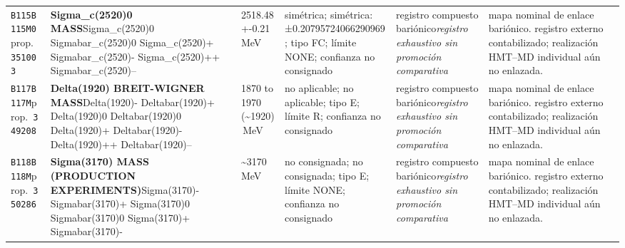 \begin{landscape}
\begin{longtable}{L{1.85cm}L{4.45cm}L{2.35cm}L{4.05cm}L{3.35cm}L{7.15cm}}
\texttt{B115}\newline \texttt{B115M0}\newline prop.\ \texttt{351003} & \textbf{Sigma\_\allowbreak{}c(2520)0 MASS}\newline Sigma\_\allowbreak{}c(2520)0 \textbar{}\allowbreak{} Sigmabar\_\allowbreak{}c(2520)0 \textbar{}\allowbreak{} Sigma\_\allowbreak{}c(2520)+ \textbar{}\allowbreak{} Sigmabar\_\allowbreak{}c(2520)- \textbar{}\allowbreak{} Sigma\_\allowbreak{}c(2520)++ \textbar{}\allowbreak{} Sigmabar\_\allowbreak{}c(2520)-- & 2518.48+-0.21\,MeV & simétrica; simétrica: ±0.20795724066290969; tipo FC; límite NONE; confianza no consignado & registro compuesto bariónico\newline \emph{registro exhaustivo sin promoción comparativa} & mapa nominal de enlace bariónico. registro externo contabilizado; realización HMT--MD individual aún no enlazada. \\
\texttt{B117}\newline \texttt{B117M}\newline prop.\ \texttt{349208} & \textbf{Delta(1920) BREIT-WIGNER MASS}\newline Delta(1920)- \textbar{}\allowbreak{} Deltabar(1920)+ \textbar{}\allowbreak{} Delta(1920)0 \textbar{}\allowbreak{} Deltabar(1920)0 \textbar{}\allowbreak{} Delta(1920)+ \textbar{}\allowbreak{} Deltabar(1920)- \textbar{}\allowbreak{} Delta(1920)++ \textbar{}\allowbreak{} Deltabar(1920)-- & 1870 to 1970 (\textasciitilde{}1920)\,MeV & no aplicable; no aplicable; tipo E; límite R; confianza no consignado & registro compuesto bariónico\newline \emph{registro exhaustivo sin promoción comparativa} & mapa nominal de enlace bariónico. registro externo contabilizado; realización HMT--MD individual aún no enlazada. \\
\texttt{B118}\newline \texttt{B118M}\newline prop.\ \texttt{350286} & \textbf{Sigma(3170) MASS (PRODUCTION EXPERIMENTS)}\newline Sigma(3170)- \textbar{}\allowbreak{} Sigmabar(3170)+ \textbar{}\allowbreak{} Sigma(3170)0 \textbar{}\allowbreak{} Sigmabar(3170)0 \textbar{}\allowbreak{} Sigma(3170)+ \textbar{}\allowbreak{} Sigmabar(3170)- & \textasciitilde{}3170\,MeV & no consignada; no consignada; tipo E; límite NONE; confianza no consignado & registro compuesto bariónico\newline \emph{registro exhaustivo sin promoción comparativa} & mapa nominal de enlace bariónico. registro externo contabilizado; realización HMT--MD individual aún no enlazada. \\

\end{longtable}
\end{landscape}
